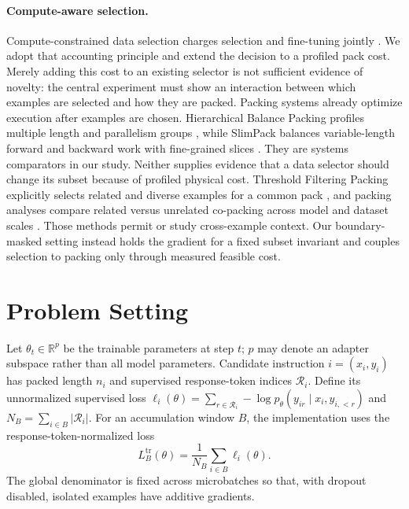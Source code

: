 \documentclass{article}
\begin{document}
\paragraph{Compute-aware selection.}
Compute-constrained data selection charges selection and fine-tuning jointly
\cite{yin2025compute}. We adopt that accounting principle and extend the
decision to a profiled pack cost. Merely adding this cost to an existing
selector is not sufficient evidence of novelty: the central experiment must
show an interaction between which examples are selected and how they are
packed.
Packing systems already optimize execution after examples are chosen.
Hierarchical Balance Packing profiles multiple length and parallelism groups
\cite{yao2025hbp}, while SlimPack balances variable-length forward and backward
work with fine-grained slices \cite{liu2025slimpack}. They are systems
comparators in our study. Neither supplies evidence that a data selector should
change its subset because of profiled physical cost.
Threshold Filtering Packing explicitly selects related and diverse examples
for a common pack \cite{dong2025tfp}, and packing analyses compare related
versus unrelated co-packing across model and dataset scales
\cite{wang2025packing}. Those methods permit or study cross-example context.
Our boundary-masked setting instead holds the gradient for a fixed subset
invariant and couples selection to packing only through measured feasible cost.

\section{Problem Setting}
\label{sec:setting}

Let $\theta_t\in\mathbb{R}^p$ be the trainable parameters at step $t$; $p$ may
denote an adapter subspace rather than all model parameters. Candidate
instruction $i=(x_i,y_i)$ has packed length $n_i$ and supervised response-token
indices $\mathcal R_i$. Define its unnormalized supervised loss
$\ell_i(\theta)=\sum_{r\in\mathcal R_i}
-\log p_\theta(y_{ir}\mid x_i,y_{i,<r})$ and
$N_B=\sum_{i\in B}|\mathcal R_i|$. For an accumulation window $B$, the
implementation uses the response-token-normalized loss
\begin{equation}
L^{\mathrm{tr}}_B(\theta)=
\frac{1}{N_B}\sum_{i\in B}\ell_i(\theta).
\label{eq:train-loss}
\end{equation}
The global denominator is fixed across microbatches so that, with dropout
disabled, isolated examples have additive gradients.
\end{document}
